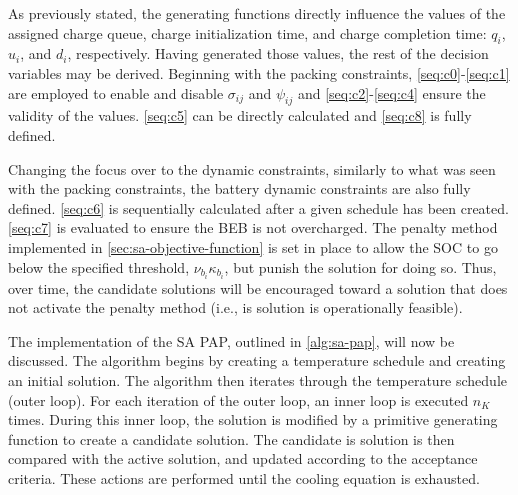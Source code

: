 \documentclass[ee,thesis]{usuthesis}
\begin{document}
As previously stated, the generating functions directly influence the values of the assigned charge queue, charge
initialization time, and charge completion time: \(q_i\), \(u_i\), and \(d_i\), respectively. Having generated those values,
the rest of the decision variables may be derived. Beginning with the packing constraints, \ref{seq:c0}-\ref{seq:c1} are
employed to enable and disable \(\sigma_{ij}\) and \(\psi_{ij}\) and \ref{seq:c2}-\ref{seq:c4} ensure the validity of the values.
\ref{seq:c5} can be directly calculated and \ref{seq:c8} is fully defined.

Changing the focus over to the dynamic constraints, similarly to what was seen with the packing constraints, the battery
dynamic constraints are also fully defined. \ref{seq:c6} is sequentially calculated after a given schedule has been
created. \ref{seq:c7} is evaluated to ensure the BEB is not overcharged. The penalty method implemented in
\ref{sec:sa-objective-function} is set in place to allow the SOC to go below the specified threshold, \(\nu_{b_i} \kappa_{b_i}\), but
punish the solution for doing so. Thus, over time, the candidate solutions will be encouraged toward a solution that
does not activate the penalty method (i.e., is solution is operationally feasible).

The implementation of the SA PAP, outlined in \ref{alg:sa-pap}, will now be discussed. The algorithm begins by creating
a temperature schedule and creating an initial solution. The algorithm then iterates through the temperature schedule
(outer loop). For each iteration of the outer loop, an inner loop is executed \(n_K\) times. During this inner loop, the
solution is modified by a primitive generating function to create a candidate solution. The candidate is solution is
then compared with the active solution, and updated according to the acceptance criteria. These actions are performed
until the cooling equation is exhausted.
\end{document}
